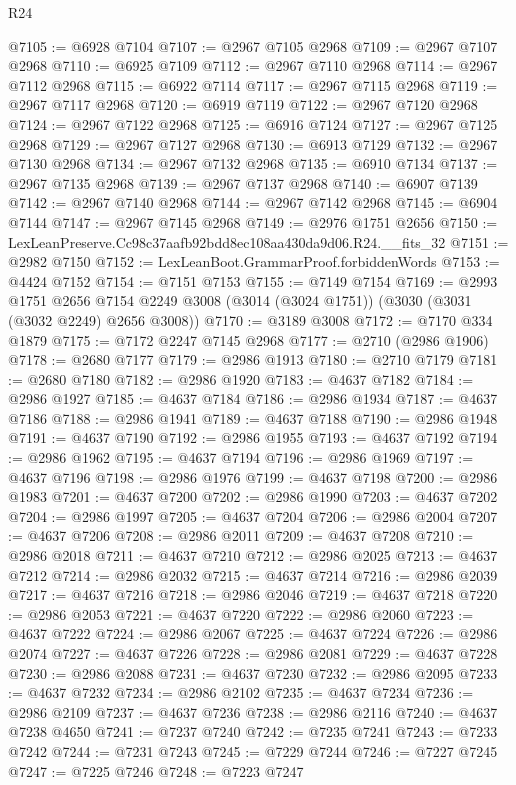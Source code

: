\begin{lexlean}{R24}
\begin{coremodule}
@7105 := @6928 @7104
@7107 := @2967 @7105 @2968
@7109 := @2967 @7107 @2968
@7110 := @6925 @7109
@7112 := @2967 @7110 @2968
@7114 := @2967 @7112 @2968
@7115 := @6922 @7114
@7117 := @2967 @7115 @2968
@7119 := @2967 @7117 @2968
@7120 := @6919 @7119
@7122 := @2967 @7120 @2968
@7124 := @2967 @7122 @2968
@7125 := @6916 @7124
@7127 := @2967 @7125 @2968
@7129 := @2967 @7127 @2968
@7130 := @6913 @7129
@7132 := @2967 @7130 @2968
@7134 := @2967 @7132 @2968
@7135 := @6910 @7134
@7137 := @2967 @7135 @2968
@7139 := @2967 @7137 @2968
@7140 := @6907 @7139
@7142 := @2967 @7140 @2968
@7144 := @2967 @7142 @2968
@7145 := @6904 @7144
@7147 := @2967 @7145 @2968
@7149 := @2976 @1751 @2656
@7150 := LexLeanPreserve.Cc98c37aafb92bdd8ec108aa430da9d06.R24.__fits_32
@7151 := @2982 @7150
@7152 := LexLeanBoot.GrammarProof.forbiddenWords
@7153 := @4424 @7152
@7154 := @7151 @7153
@7155 := @7149 @7154
@7169 := @2993
    @1751
    @2656
    @7154
    @2249
    @3008
    (@3014 (@3024 @1751))
    (@3030 (@3031 (@3032 @2249) @2656 @3008))
@7170 := @3189 @3008
@7172 := @7170 @334 @1879
@7175 := @7172 @2247 @7145 @2968
@7177 := @2710 (@2986 @1906)
@7178 := @2680 @7177
@7179 := @2986 @1913
@7180 := @2710 @7179
@7181 := @2680 @7180
@7182 := @2986 @1920
@7183 := @4637 @7182
@7184 := @2986 @1927
@7185 := @4637 @7184
@7186 := @2986 @1934
@7187 := @4637 @7186
@7188 := @2986 @1941
@7189 := @4637 @7188
@7190 := @2986 @1948
@7191 := @4637 @7190
@7192 := @2986 @1955
@7193 := @4637 @7192
@7194 := @2986 @1962
@7195 := @4637 @7194
@7196 := @2986 @1969
@7197 := @4637 @7196
@7198 := @2986 @1976
@7199 := @4637 @7198
@7200 := @2986 @1983
@7201 := @4637 @7200
@7202 := @2986 @1990
@7203 := @4637 @7202
@7204 := @2986 @1997
@7205 := @4637 @7204
@7206 := @2986 @2004
@7207 := @4637 @7206
@7208 := @2986 @2011
@7209 := @4637 @7208
@7210 := @2986 @2018
@7211 := @4637 @7210
@7212 := @2986 @2025
@7213 := @4637 @7212
@7214 := @2986 @2032
@7215 := @4637 @7214
@7216 := @2986 @2039
@7217 := @4637 @7216
@7218 := @2986 @2046
@7219 := @4637 @7218
@7220 := @2986 @2053
@7221 := @4637 @7220
@7222 := @2986 @2060
@7223 := @4637 @7222
@7224 := @2986 @2067
@7225 := @4637 @7224
@7226 := @2986 @2074
@7227 := @4637 @7226
@7228 := @2986 @2081
@7229 := @4637 @7228
@7230 := @2986 @2088
@7231 := @4637 @7230
@7232 := @2986 @2095
@7233 := @4637 @7232
@7234 := @2986 @2102
@7235 := @4637 @7234
@7236 := @2986 @2109
@7237 := @4637 @7236
@7238 := @2986 @2116
@7240 := @4637 @7238 @4650
@7241 := @7237 @7240
@7242 := @7235 @7241
@7243 := @7233 @7242
@7244 := @7231 @7243
@7245 := @7229 @7244
@7246 := @7227 @7245
@7247 := @7225 @7246
@7248 := @7223 @7247

\end{coremodule}
\end{lexlean}
